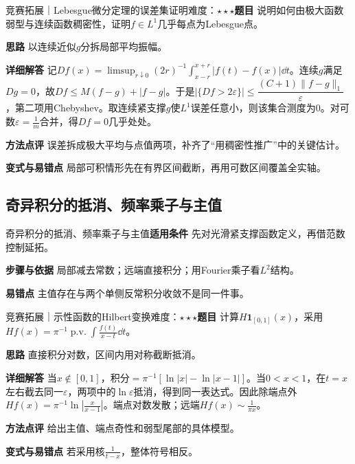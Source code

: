 \begin{example}{竞赛拓展｜Lebesgue微分定理的误差集证明}{难度：$\star\star\star$}\label{deep:ex:fourier_source_deep:differentiation}\textbf{题目} 说明如何由极大函数弱型与连续函数稠密性，证明$f\in L^1$几乎每点为Lebesgue点。\par\textbf{思路} 以连续近似$g$分拆局部平均振幅。\par\textbf{详细解答} 记$D f(x)=\limsup_{r\downarrow0}(2r)^{-1}\int_{x-r}^{x+r}|f(t)-f(x)|\dd t$。连续$g$满足$Dg=0$，故$Df\le M(f-g)+|f-g|$。于是$\lvert\{Df>2\varepsilon\}\rvert\le\dfrac{(C+1)\lVert f-g\rVert_1}{\varepsilon}$，第二项用Chebyshev。取连续紧支撑$g$使$L^1$误差任意小，则该集合测度为0。对可数$\varepsilon=\frac{1}{m}$合并，得$Df=0$几乎处处。\par\textbf{方法点评} 误差拆成极大平均与点值两项，补齐了“用稠密性推广”中的关键估计。\par\textbf{变式与易错点} 局部可积情形先在有界区间截断，再用可数区间覆盖全实轴。\end{example}

\subsection{奇异积分的抵消、频率乘子与主值}\label{deep:fourier_source_deep:hilbertproof}

\begin{method}{奇异积分的抵消、频率乘子与主值}\textbf{适用条件} 先对光滑紧支撑函数定义，再借范数控制延拓。\par\textbf{步骤与依据} 局部减去常数；远端直接积分；用Fourier乘子看$L^2$结构。\par\textbf{易错点} 主值存在与两个单侧反常积分收敛不是同一件事。\end{method}

\begin{example}{竞赛拓展｜示性函数的Hilbert变换}{难度：$\star\star\star$}\label{deep:ex:fourier_source_deep:hilbertindicator}\textbf{题目} 计算$H\mathbf1_{[0,1]}(x)$，采用$Hf(x)=\pi^{-1}\operatorname{p.v.}\int \frac{f(t)}{x-t}\dd t$。\par\textbf{思路} 直接积分对数，区间内用对称截断抵消。\par\textbf{详细解答} 当$x\notin[0,1]$，积分$=\pi^{-1}[\ln|x|-\ln|x-1|]$。当$0<x<1$，在$t=x$左右截去同一$\varepsilon$，两项中的$\ln\varepsilon$抵消，得到同一表达式。因此除端点外$Hf(x)=\pi^{-1}\ln|\frac{x}{x-1}|$。端点对数发散；远端$Hf(x)\sim\frac{1}{\pi x}$。\par\textbf{方法点评} 给出主值、端点奇性和弱型尾部的具体模型。\par\textbf{变式与易错点} 若采用核$\frac{1}{t-x}$，整体符号相反。\end{example}

